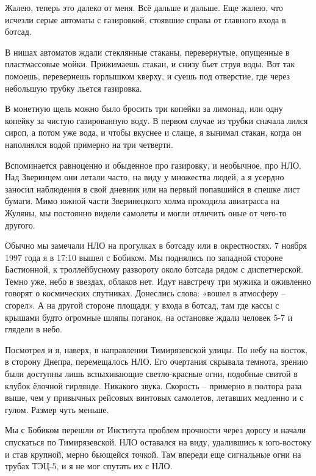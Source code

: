 Жалею, теперь это далеко от меня. Всё дальше и дальше. Еще жалею, что исчезли серые автоматы с газировкой, стоявшие справа от главного входа в ботсад.

В нишах автоматов ждали стеклянные стаканы, перевернутые, опущенные в пластмассовые мойки. Прижимаешь стакан, и снизу бьет струя воды. Вот так помоешь, перевернешь горлышком кверху, и суешь под отверстие, где через небольшую трубку льется газировка.

В монетную щель можно было бросить три копейки за лимонад, или одну копейку за чистую газированную воду. В первом случае из трубки сначала лился сироп, а потом уже вода, и чтобы вкуснее и слаще, я вынимал стакан, когда он наполнялся водой примерно на три четверти.%

Вспоминается равноценно и обыденное про газировку, и необычное, про НЛО. Над Зверинцем они летали часто, на виду у множества людей, а я усердно заносил наблюдения в свой дневник или на первый попавшийся в спешке лист бумаги. Мимо южной части Зверинецкого холма проходила авиатрасса на Жуляны, мы постоянно видели самолеты и могли отличить оные от чего-то другого.

Обычно мы замечали НЛО на прогулках в ботсаду или в окрестностях. 7 ноября 1997 года я в 17:10 вышел с Бобиком. Мы поднялись по западной стороне Бастионной, к троллейбусному развороту около ботсада рядом с диспетчерской. Темно уже, небо в звездах, облаков нет. Идут навстречу три мужика и оживленно говорят о космических спутниках. Донеслись слова: «вошел в атмосферу – сгорел». А на другой стороне площади, у входа в ботсад, там где кассы с крышами будто огромные шляпы поганок, на остановке ждали человек 5-7 и глядели в небо.

Посмотрел и я, наверх, в направлении Тимирязевской улицы. По небу на восток, в сторону Днепра, перемещалось НЛО. Его очертания скрывала темнота, зрению были доступны лишь вспыхивающие светло-красные огни, подобные свитой в клубок ёлочной гирлянде. Никакого звука. Скорость – примерно в полтора раза выше, чем у привычных рейсовых винтовых самолетов, летавших медленно и с гулом. Размер чуть меньше.

Мы с Бобиком перешли от Института проблем прочности через дорогу и начали спускаться по Тимирязевской. НЛО оставался на виду, удалившись к юго-востоку и став крупной, мерно бьющейся точкой. Там впереди еще сигнальные огни на трубах ТЭЦ-5, и я не мог спутать их с НЛО.


